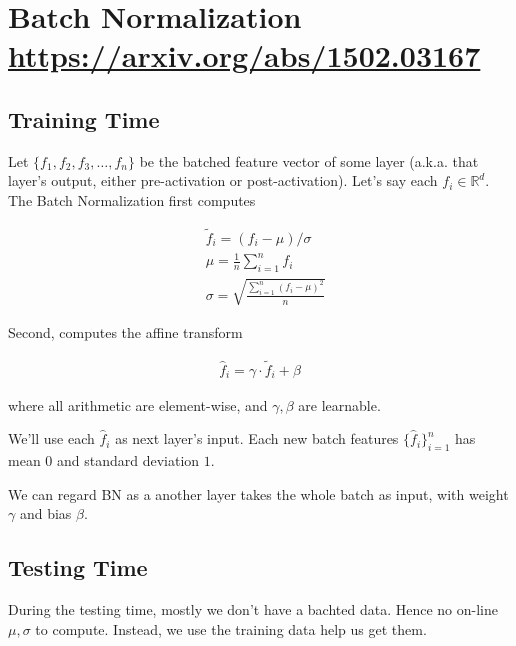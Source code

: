 \documentclass{article}
\begin{document}
    \section*{Batch Normalization\href{https://arxiv.org/abs/1502.03167}{ https://arxiv.org/abs/1502.03167}}

        \subsection*{Training Time}

            Let $ \{ f_{1}, f_{2}, f_{3}, \dots, f_{n} \} $ be the batched feature
            vector of some layer (a.k.a. that layer's output, either pre-activation
            or post-activation). Let's say each $ f_{i} \in \mathbb{R}^d $. The
            Batch Normalization first computes

            \begin{align*}
                & \tilde{f}_{i} = ( f_{i} - \mu ) / \sigma \\
                & \mu = \frac{1}{n} \sum_{i = 1}^n f_{i} \\
                & \sigma = \sqrt{\frac{\sum_{i = 1}^n ( f_{i} - \mu )^2}{n}}
            \end{align*}

            Second, computes the affine transform

            \begin{align*}
                 \hat{f}_{i} = \gamma \cdot \tilde{f}_{i} + \beta
            \end{align*}

            where all arithmetic are element-wise, and $ \gamma, \beta $ are learnable. 

            We'll use each $ \hat{f}_{i} $ as next layer's input. Each new
            batch features $ \{ \hat{f}_{i} \}_{i = 1}^n $ has mean $ 0 $ and
            standard deviation $ 1 $.

            We can regard BN as a another layer takes the whole batch as input,
            with weight $ \gamma $ and bias $ \beta $.

        \subsection*{Testing Time}

            During the testing time, mostly we don't have a bachted data. Hence
            no on-line $ \mu, \sigma $ to compute. Instead, we use the training
            data help us get them.
\end{document}
